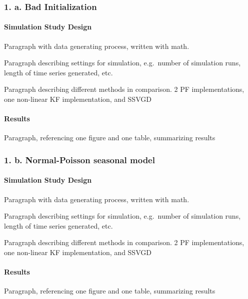 \documentclass[]{article}
\let\oldparagraph\paragraph
\renewcommand{\paragraph}[1]{\oldparagraph{#1}\mbox{}}
\begin{document}
\subsubsection{1. a. Bad Initialization}\label{a.-bad-initialization}

\paragraph{Simulation Study Design}\label{simulation-study-design}

Paragraph with data generating process, written with math.

Paragraph describing settings for simulation, e.g.~number of simulation
runs, length of time series generated, etc.

Paragraph describing different methods in comparison. 2 PF
implementations, one non-linear KF implementation, and SSVGD

\paragraph{Results}\label{results}

Paragraph, referencing one figure and one table, summarizing results

\subsubsection{1. b. Normal-Poisson seasonal
model}\label{b.-normal-poisson-seasonal-model}

\paragraph{Simulation Study Design}\label{simulation-study-design-1}

Paragraph with data generating process, written with math.

Paragraph describing settings for simulation, e.g.~number of simulation
runs, length of time series generated, etc.

Paragraph describing different methods in comparison. 2 PF
implementations, one non-linear KF implementation, and SSVGD

\paragraph{Results}\label{results-1}

Paragraph, referencing one figure and one table, summarizing results
\end{document}
